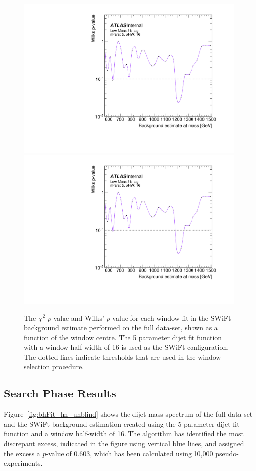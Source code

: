 \begin{figure}[!htb]
\captionsetup[subfigure]{aboveskip=0pt,justification=centering}
\centering
{} {
  \includegraphics[width=0.43\linewidth, angle=0,page=4]{figs/Dibjet/LowMass/FitStudy_min566/windowSel_unblind_just16.pdf}
}\hspace{-5mm}
 {
  \includegraphics[width=0.43\linewidth, angle=0,page=1]{figs/Dibjet/LowMass/FitStudy_min566/windowSel_unblind_just16.pdf}
}
\vspace{1pt}
\caption{\label{fig:windowSel_unblind_just16}
  The  $\chi^{2}$ \mbox{$p$-value} and Wilks' \mbox{$p$-value} for each window fit in the SWiFt background estimate
  performed on the full \lm{} data-set, shown as a function of the window centre.
  The 5 parameter dijet fit function with a window half-width of 16 is used as the SWiFt configuration.
  The dotted lines indicate thresholds that are used in the window selection procedure.
}
\end{figure}

\FloatBarrier
\clearpage

\subsection{Search Phase Results}
\label{sec:bkg-full_results}

Figure~\ref{fig:bhFit_lm_unblind} shows the dijet mass spectrum of the full \lm{} data-set
and the SWiFt background estimation created using the 5 parameter dijet fit function and a window half-width of 16.
The \bh{} algorithm has identified the most discrepant excess, indicated in the figure using vertical blue lines,
and assigned the excess a \mbox{$p$-value} of 0.603, which has been calculated using 10,000 pseudo-experiments.

